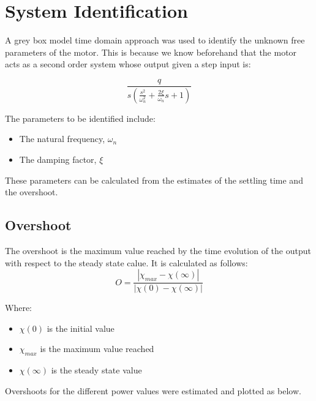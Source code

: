 \clearpage
\section{System Identification}
\label{sec:systemIdentification}
A grey box model time domain approach was used to identify the unknown free parameters of the motor. This is because we know beforehand that the motor acts as a second order system whose output given a step input is:

\begin{equation}
	\frac{q}{s(\frac{s^2}{\omega^2_n} + \frac{2\xi}{\omega_n}s + 1)}
\end{equation}

The parameters to be identified include:
\begin{itemize}
	\item The natural frequency, $\omega _n$
    \item The damping factor, $\xi$
\end{itemize}
These parameters can be calculated from the estimates of the settling time and the overshoot.
\newline
\subsection{Overshoot}
\label{sec:overshoot}
The overshoot is the maximum value reached by the time evolution of the output with respect to the steady state calue. It is calculated as follows:
\begin{equation}
 O = \frac{|\chi _{max} - \chi (\infty )|}{|\chi (0) - \chi (\infty )|}
\end{equation}

Where:
\begin{itemize}
	\item $\chi (0)$ is the initial value
    \item $\chi _{max}$ is the maximum value reached
    \item $\chi (\infty )$ is the steady state value
\end{itemize}

Overshoots for the different power values were estimated and plotted as below.

